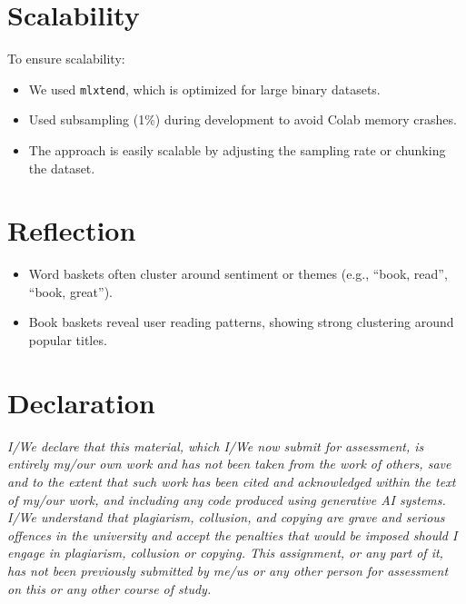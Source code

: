 \documentclass{article}
\begin{document}
\section{Scalability}
To ensure scalability:
\begin{itemize}
    \item We used \texttt{mlxtend}, which is optimized for large binary datasets.
    \item Used subsampling (1\%) during development to avoid Colab memory crashes.
    \item The approach is easily scalable by adjusting the sampling rate or chunking the dataset.
\end{itemize}

\section{Reflection}
\begin{itemize}
    \item Word baskets often cluster around sentiment or themes (e.g., “book, read”, “book, great”).
    \item Book baskets reveal user reading patterns, showing strong clustering around popular titles.
\end{itemize}

\section*{Declaration}
\textit{
I/We declare that this material, which I/We now submit for assessment, is entirely my/our own work and has not been taken from the work of others, save and to the extent that such work has been cited and acknowledged within the text of my/our work, and including any code produced using generative AI systems. I/We understand that plagiarism, collusion, and copying are grave and serious offences in the university and accept the penalties that would be imposed should I engage in plagiarism, collusion or copying. This assignment, or any part of it, has not been previously submitted by me/us or any other person for assessment on this or any other course of study.
}
\end{document}

